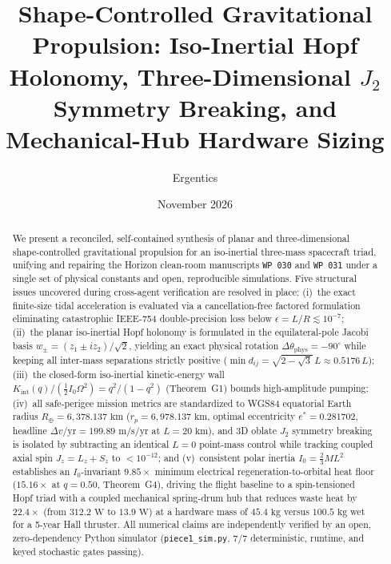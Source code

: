 \documentclass[11pt]{amsart}
\title[Shape-Controlled Gravitational Propulsion]{Shape-Controlled Gravitational Propulsion: Iso-Inertial Hopf Holonomy, Three-Dimensional $J_2$ Symmetry Breaking, and Mechanical-Hub Hardware Sizing}
\author{Ergentics}
\date{November 2026}
\numberwithin{equation}{section}
\theoremstyle{plain}
\theoremstyle{definition}\newtheorem{definition}[theorem]{Definition}
\theoremstyle{remark}\newtheorem{remark}[theorem]{Remark}
\begin{document}
\begin{abstract}
We present a reconciled, self-contained synthesis of planar and three-dimensional shape-controlled gravitational propulsion for an iso-inertial three-mass spacecraft triad, unifying and repairing the Horizon clean-room manuscripts \texttt{WP~030} and \texttt{WP~031} under a single set of physical constants and open, reproducible simulations. Five structural issues uncovered during cross-agent verification are resolved in place: (i)~the exact finite-size tidal acceleration is evaluated via a cancellation-free factored formulation eliminating catastrophic IEEE-754 double-precision loss below $\epsilon = L/R \lesssim 10^{-7}$; (ii)~the planar iso-inertial Hopf holonomy is formulated in the equilateral-pole Jacobi basis $w_\pm = (z_1 \pm i z_2)/\sqrt{2}$, yielding an exact physical rotation $\Delta\theta_{\mathrm{phys}} = -90^\circ$ while keeping all inter-mass separations strictly positive ($\min d_{ij} = \sqrt{2-\sqrt{3}}\,L \approx 0.5176\,L$); (iii)~the closed-form iso-inertial kinetic-energy wall $K_{\mathrm{int}}(q)/(\tfrac12 I_0 \Omega^2) = q^2/(1-q^2)$ (Theorem~G1) bounds high-amplitude pumping; (iv)~all safe-perigee mission metrics are standardized to WGS84 equatorial Earth radius $R_\oplus = 6{,}378.137\text{ km}$ ($r_p = 6{,}978.137\text{ km}$, optimal eccentricity $e^* = 0.281702$, headline $\Delta v/\mathrm{yr} = 199.89\text{ m/s/yr}$ at $L=20\text{ km}$), and 3D oblate $J_2$ symmetry breaking is isolated by subtracting an identical $L=0$ point-mass control while tracking coupled axial spin $J_z = L_z + S_z$ to $< 10^{-12}$; and (v)~consistent polar inertia $I_0 = \frac23 M L^2$ establishes an $I_0$-invariant $9.85\times$ minimum electrical regeneration-to-orbital heat floor ($15.16\times$ at $q=0.50$, Theorem~G4), driving the flight baseline to a spin-tensioned Hopf triad with a coupled mechanical spring-drum hub that reduces waste heat by $22.4\times$ (from $312.2\text{ W}$ to $13.9\text{ W}$) at a hardware mass of $45.4\text{ kg}$ versus $100.5\text{ kg}$ wet for a 5-year Hall thruster. All numerical claims are independently verified by an open, zero-dependency Python simulator (\texttt{piece1\_sim.py}, 7/7 deterministic, runtime, and keyed stochastic gates passing).
\end{abstract}
\maketitle
\end{document}
